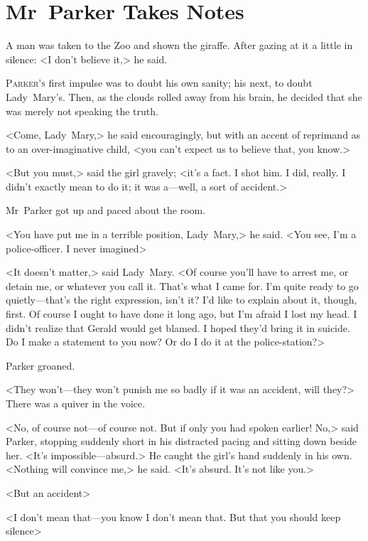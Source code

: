 

\chapter{Mr~Parker Takes Notes}

\epigraph{A man was taken to the Zoo and shown the giraffe.  After gazing at it a little in silence: <I don't believe it,> he said.}{}


\lettrine{P}{arker's} first impulse was to doubt his own sanity; his next, to doubt Lady~Mary's. Then, as the clouds rolled away from his brain, he decided that she was merely not speaking the truth.

\zz
<Come, Lady~Mary,> he said encouragingly, but with an accent of reprimand as to an over-imaginative child, <you can't expect us to believe that, you know.>

<But you must,> said the girl gravely; <it's a fact. I shot him. I did, really. I didn't exactly mean to do it; it was a—well, a sort of accident.>

Mr~Parker got up and paced about the room.

<You have put me in a terrible position, Lady~Mary,> he said. <You see, I'm a police-officer. I never imagined\longdash>

<It doesn't matter,> said Lady~Mary. <Of course you'll have to arrest me, or detain me, or whatever you call it. That's what I came for. I'm quite ready to go quietly—that's the right expression, isn't it? I'd like to explain about it, though, first. Of course I ought to have done it long ago, but I'm afraid I lost my head. I didn't realize that Gerald would get blamed. I hoped they'd bring it in suicide. Do I make a statement to you now? Or do I do it at the police-station?>

Parker groaned.

<They won't—they won't punish me so badly if it was an accident, will they?> There was a quiver in the voice.

<No, of course not—of course not. But if only you had spoken earlier!  No,> said Parker, stopping suddenly short in his distracted pacing and sitting down beside her. <It's impossible—absurd.> He caught the girl's hand suddenly in his own. <Nothing will convince me,> he said.  <It's absurd. It's not like you.>

<But an accident\longdash>

<I don't mean that—you know I don't mean that. But that you should keep silence\longdash>

